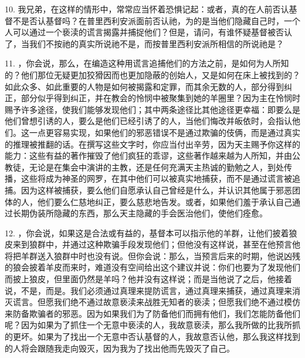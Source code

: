 10. 我兄弟，在这样的情形中，常常应当怀着恐惧记起：或者，真的在人前否认基督不是否认基督吗？在普里西利安派面前否认祂，为的是当他们隐藏自己时，一个人可以通过一个亵渎的谎言揭露并捕捉他们？但是，请问，有谁怀疑基督被否认了，当我们不按祂的真实所说祂不是，而按普里西利安派所相信的所说祂是？\par

11. ，你会说，那么，在编造这种用谎言追捕他们的方法之前，是如何为人所知的？他们那位无疑更加狡猾因而也更加隐蔽的创始人，又是如何在床上被找到的？如此众多、如此重要的人物是如何被揭露和定罪，而其余无数的人，部分得到纠正，部分似乎得到纠正，并在教会的怜悯中被聚集到她的羊圈里？因为主在怜悯时赐予许多途径，使我们能够发现他们；其中两条途径比其他途径更幸福：即要么是他们曾想引诱的人，要么是他们已经引诱了的人，当他们悔改并皈依时，会指认他们。这一点更容易实现，如果他们的邪恶错误不是通过欺骗的伎俩，而是通过真实的推理被推翻的话。在撰写这些文字时，你应当付出辛劳，因为天主赐予你这样的能力：这些有益的著作摧毁了他们疯狂的乖谬，这些著作越来越为人所知，并由公教徒，无论是在集会中演讲的主教，还是任何充满天主热诚的勤勉之人，到处传播，这些将成为神圣的网罗，在其中他们可以被真实地捕获，而不是通过谎言被追捕。因为这样被捕获，要么他们自愿承认自己曾经是什么，并认识其他属于邪恶团体的人，他们要么仁慈地纠正，要么慈悲地告发。或者，如果他们羞于承认自己通过长期伪装所隐藏的东西，那么天主隐藏的手会医治他们，使他们痊愈。\par

12. ，你会说，如果这是合法或有益的，基督本可以指示他的羊群，让他们披着狼皮来到狼群中，并通过这种欺骗手段发现他们；但他没有这样说，甚至在他预言他将把羊群送入狼群中时也没有说。但你会说：那么，当预言后来的时期，他说凶残的狼会披着羊皮而来时，难道没有空间给出这个建议并说：你们也要为了发现他们而披上狼皮，但里面仍然是羊吗？他并没有这样说；而是当他说了之后，他接着说，不是，而是。我们必须通过真理来提防谎言，通过真理来捕获，通过真理来消灭谎言。但愿我们绝不通过故意亵渎来战胜无知者的亵渎；但愿我们绝不通过模仿来防备欺骗者的邪恶。因为如果我们为了防备他们而拥有他们，我们怎能防备他们呢？因为如果为了抓住一个无意中亵渎的人，我故意亵渎，那么我所做的比我所抓的更坏。如果为了找出一个无意中否认基督的人，我故意否认他，那么我这样找到的人将会跟随我走向毁灭，因为我为了找出他而先毁灭了自己。\par

